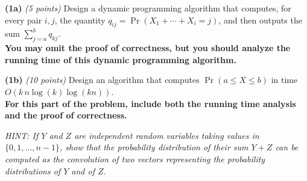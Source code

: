 \documentclass[12pt]{article}
\def\gap{0.1in}
\def\bigap{0.25in}
\begin{document}
\setlength{\parindent}{0in}
\addtolength{\parskip}{0.1cm}
\setlength{\fboxrule}{.5mm}\setlength{\fboxsep}{1.2mm}
\newlength{\boxlength}\setlength{\boxlength}{\textwidth}
\addtolength{\boxlength}{-4mm}
\begin{center}
\end{center}
\vspace{5mm}
\vskip \bigap
{\bf (1a)} {\em (5 points)}
Design a dynamic programming algorithm that computes,
for every pair $i,j$, the quantity $q_{ij} =
\Pr(X_1+\cdots+X_i = j)$, and then outputs
the sum $\sum_{j=a}^b q_{kj}$. \\[6pt] {\bf You may omit
the proof of correctness, but you should analyze the
running time of this dynamic programming algorithm.}

\vskip \gap
{\bf (1b)} {\em (10 points)}
Design an algorithm
that computes $\Pr(a \le X \le b)$
in time $O(k \, n \log (k) \log (kn))$. \\[6pt]
{\bf For this part of the problem, include both the
running time analysis and the proof of correctness.}

{\em HINT: If $Y$ and $Z$ are independent random
variables taking values in $\{0,1,\ldots,n-1\}$,
show that the probability distribution of their
sum $Y+Z$ can be computed as the convolution
of two vectors representing the probability
distributions of $Y$ and of $Z$.}

\vskip \bigap

\end{document}
